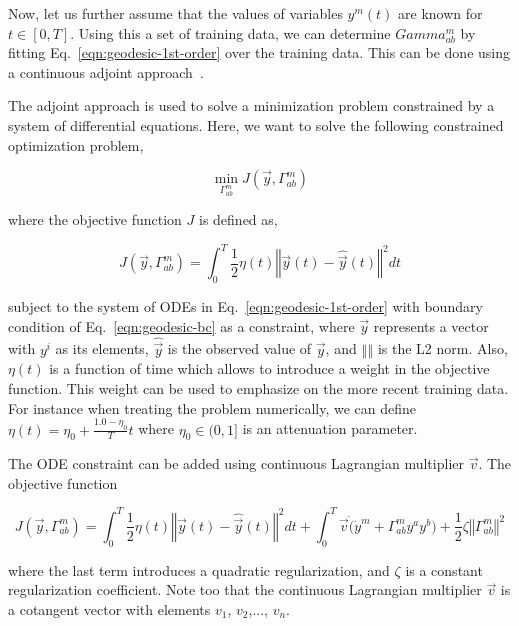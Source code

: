 \documentclass{article}
\begin{document}
Now, let us further assume that the values of variables $y^{m}(t)$ are
known for $t \in [0,T]$. Using this a set of training data, we can
determine $Gamma^{m}_{ab}$ by fitting Eq.~\ref{eqn:geodesic-1st-order}
over the training data. This can be done using a continuous adjoint
approach~\cite{ref:adjoint-giles}.

The adjoint approach is used to solve a minimization problem
constrained by a system of differential equations. Here, we want to
solve the following constrained optimization problem,

\begin{equation}\label{eqn:optimization-problem}
\min_{\Gamma^{m}_{ab}} J(\vec{y},\Gamma^{m}_{ab})
\end{equation}

where the objective function $J$ is defined as,

\begin{equation}\label{eqn:optimization-objective-raw}
J(\vec{y},\Gamma^{m}_{ab}) = \int_{0}^{T} \frac{1}{2} \eta(t) \left\Vert
\vec{y}(t) - \hat{\vec{y}}(t) \right\Vert^{2} dt
\end{equation}

subject to the system of ODEs in Eq.~\ref{eqn:geodesic-1st-order} with
boundary condition of Eq.~\ref{eqn:geodesic-bc} as a constraint, where
$\vec{y}$ represents a vector with $y^{i}$ as its elements,
$\hat{\vec{y}}$ is the observed value of $\vec{y}$, and $\left\Vert
\right\Vert$ is the L2 norm. Also, $\eta(t)$ is a function of time
which allows to introduce a weight in the objective function. This
weight can be used to emphasize on the more recent training data. For
instance when treating the problem numerically, we can define $\eta(t)
= \eta_{0} + \frac{1.0 - \eta_{0}}{T} t$ where $\eta_{0} \in (0,1]$ is
  an attenuation parameter.

The ODE constraint can be added using continuous Lagrangian multiplier
$\vec{v}$. The objective function

\begin{equation}\label{eqn:optimization-objective}
J(\vec{y},\Gamma^{m}_{ab}) = \int_{0}^{T} \frac{1}{2} \eta(t)
\left\Vert \vec{y}(t) - \hat{\vec{y}}(t) \right\Vert^{2} dt +
\int_{0}^{T} \vec{v} \dot ( \dot{y}^{m} + \Gamma^{m}_{ab} y^{a} y^{b}
) + \frac{1}{2} \zeta \left\Vert \Gamma^{m}_{ab} \right\Vert^{2}
\end{equation}

where the last term introduces a quadratic regularization, and $\zeta$
is a constant regularization coefficient. Note too that the continuous
Lagrangian multiplier $\vec{v}$ is a cotangent vector with elements
$v_{1}$, $v_{2}$,..., $v_{n}$.
\end{document}
